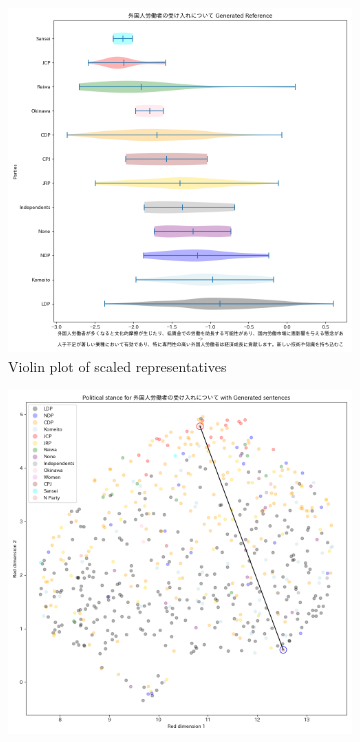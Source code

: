 \documentclass[final,5p,times,twocolumn,authoryear]{elsarticle}
\begin{document}
\begin{figure}[h]
\centering
    \begin{subfigure}{0.22\textwidth}
      \centering
      \includegraphics[width=1\linewidth]{figs/results/economy/foreignworkers_gen_violin_plot.png}
      \caption{Violin plot of scaled representatives}
    \end{subfigure}
    \begin{subfigure}{0.22\textwidth}
      \centering
      \includegraphics[width=1\linewidth]{figs/results/economy/foreignworkers_umap_gen.png}

\end{subfigure}
\end{figure}
\end{document}
